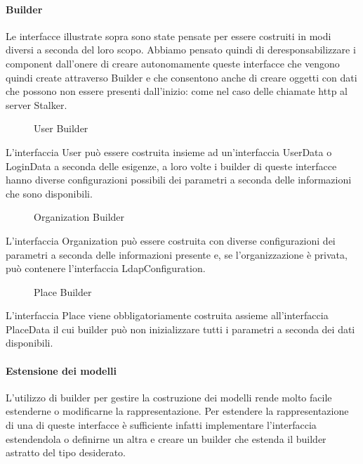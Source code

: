 \documentclass[../../manuale-manutentore.tex]{subfiles}
\begin{document}
\paragraph{Builder}%
\label{par:builder}
Le interfacce illustrate sopra sono state pensate per essere costruiti in modi diversi a seconda del loro scopo.
Abbiamo pensato quindi di deresponsabilizzare i component dall'onere di creare autonomamente queste interfacce che vengono quindi create attraverso Builder e che consentono anche di creare oggetti con dati che possono non essere presenti dall'inizio: come nel caso delle chiamate http al server Stalker.
\begin{figure}[H]
  \centering
  \caption{User Builder}%
  \label{fig:web-app-user-builder}
\end{figure}
L'interfaccia User può essere costruita insieme ad un'interfaccia UserData o LoginData a seconda delle esigenze, a loro volte i builder di queste interfacce hanno diverse configurazioni possibili dei parametri a seconda delle informazioni che sono disponibili.
\begin{figure}[H]
  \centering
  \caption{Organization Builder}%
  \label{fig:web-app-organization-builder}
\end{figure}
L'interfaccia Organization può essere costruita con diverse configurazioni dei parametri a seconda delle informazioni presente e, se l'organizzazione è privata, può contenere l'interfaccia LdapConfiguration.
\begin{figure}[H]
  \centering
  \caption{Place Builder}%
  \label{fig:web-app-place-builder}
\end{figure}
L'interfaccia Place viene obbligatoriamente costruita assieme all'interfaccia PlaceData il cui builder può non inizializzare tutti i parametri a seconda dei dati disponibili.

\paragraph{Estensione dei modelli}%
\label{par:estensione_interfacce_webapp}

L'utilizzo di builder per gestire la costruzione dei modelli rende molto facile estenderne o modificarne la rappresentazione.
Per estendere la rappresentazione di una di queste interfacce è sufficiente infatti implementare l'interfaccia estendendola o definirne un altra e creare un builder che estenda il builder astratto del tipo desiderato.
\end{document}
